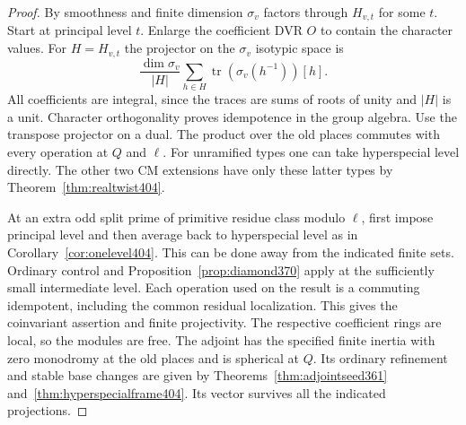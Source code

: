 \documentclass[a4paper,11pt]{article}
\theoremstyle{definition}
\theoremstyle{remark}
\numberwithin{equation}{section}
\begin{document}
\begin{proof}
By smoothness and finite dimension \(\sigma_v\) factors through
\(H_{v,t}\) for some \(t\). Start at principal level \(t\).
Enlarge the coefficient DVR \(O\) to contain the character
values. For \(H=H_{v,t}\) the projector on the \(\sigma_v\)
isotypic space is
\[
       \frac{\dim\sigma_v}{|H|}
             \sum_{h\in H}\operatorname{tr}(\sigma_v(h^{-1}))[h].
\]
All coefficients are integral, since the traces are sums of
roots of unity and \(|H|\) is a unit. Character orthogonality
proves idempotence in the group algebra. Use the transpose
projector on a dual. The product over the old places commutes
with every operation at \(Q\) and \(\ell\). For unramified
types one can take hyperspecial level directly. The other
two CM extensions have only these latter types by
Theorem~\ref{thm:realtwist404}.

At an extra odd split prime of primitive residue class modulo
\(\ell\), first impose principal level and then average back to
hyperspecial level as in Corollary~\ref{cor:onelevel404}.
This can be done away from the indicated finite sets. Ordinary
control and Proposition~\ref{prop:diamond370} apply at the
sufficiently small intermediate level. Each operation used on
the result is a commuting idempotent, including the common
residual localization. This gives the coinvariant assertion
and finite projectivity. The respective coefficient rings are
local, so the modules are free. The adjoint has the specified
finite inertia with zero monodromy at the old places and is
spherical at \(Q\). Its ordinary refinement and stable base
changes are given by Theorems~\ref{thm:adjointseed361}
and~\ref{thm:hyperspecialframe404}. Its vector survives all
the indicated projections.
\end{proof}
\end{document}
